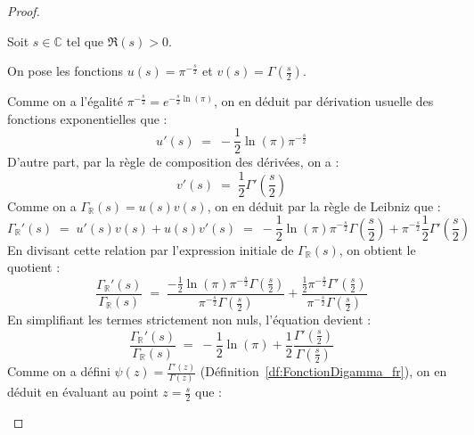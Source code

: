 \documentclass[Riemann_Hypothesis.tex]{subfiles}
\begin{document}
\begin{proof}
    \begin{part_proof}
        Soit $s \in \mathbb{C}$ tel que $\Re(s) > 0$. \par
        On pose les fonctions $u(s) = \pi^{-\frac{s}{2}}$ et $v(s) = \Gamma\left(\frac{s}{2}\right)$. \par
        Comme on a l'égalité $\pi^{-\frac{s}{2}} = e^{-\frac{s}{2} \ln(\pi)}$, on en déduit par dérivation usuelle des fonctions exponentielles que :
        \begin{equation*}
            u'(s) \;=\; -\frac{1}{2}\ln(\pi) \pi^{-\frac{s}{2}}
        \end{equation*}
        D'autre part, par la règle de composition des dérivées, on a :
        \begin{equation*}
            v'(s) \;=\; \frac{1}{2} \Gamma'\left(\frac{s}{2}\right)
        \end{equation*}
        Comme on a $\Gamma_{\mathbb{R}}(s) = u(s)v(s)$, on en déduit par la règle de Leibniz que :
        \begin{equation*}
            \Gamma_{\mathbb{R}}'(s) \;=\; u'(s)v(s) + u(s)v'(s) \;=\; -\frac{1}{2}\ln(\pi) \pi^{-\frac{s}{2}} \Gamma\left(\frac{s}{2}\right) + \pi^{-\frac{s}{2}} \frac{1}{2} \Gamma'\left(\frac{s}{2}\right)
        \end{equation*}
        En divisant cette relation par l'expression initiale de $\Gamma_{\mathbb{R}}(s)$, on obtient le quotient :
        \begin{equation*}
            \frac{\Gamma_{\mathbb{R}}'(s)}{\Gamma_{\mathbb{R}}(s)} \;=\; \frac{-\frac{1}{2}\ln(\pi) \pi^{-\frac{s}{2}} \Gamma\left(\frac{s}{2}\right)}{\pi^{-\frac{s}{2}} \Gamma\left(\frac{s}{2}\right)} + \frac{\frac{1}{2} \pi^{-\frac{s}{2}} \Gamma'\left(\frac{s}{2}\right)}{\pi^{-\frac{s}{2}} \Gamma\left(\frac{s}{2}\right)}
        \end{equation*}
        En simplifiant les termes strictement non nuls, l'équation devient :
        \begin{equation*}
            \frac{\Gamma_{\mathbb{R}}'(s)}{\Gamma_{\mathbb{R}}(s)} \;=\; -\frac{1}{2}\ln(\pi) + \frac{1}{2} \frac{\Gamma'\left(\frac{s}{2}\right)}{\Gamma\left(\frac{s}{2}\right)}
        \end{equation*}
        Comme on a défini $\psi(z) = \frac{\Gamma'(z)}{\Gamma(z)}$ 
        (Définition~\ref{df:FonctionDigamma_fr}), on en déduit en évaluant au point $z = \frac{s}{2}$ que :
        \begin{equation*}

\end{equation*}
\end{part_proof}
\end{proof}
\end{document}
